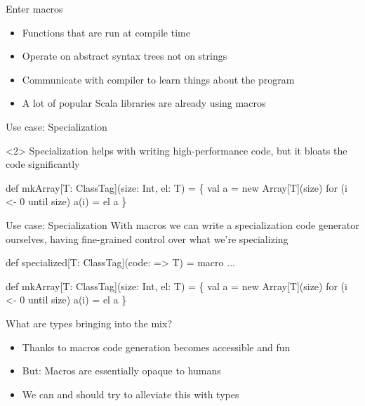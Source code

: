 \documentclass{beamer}
\begin{document}

\begin{frame}{Enter macros}
  \begin{itemize}
    \item Functions that are run at compile time
    \item Operate on abstract syntax trees not on strings
    \item Communicate with compiler to learn things about the program
    \item A lot of popular Scala libraries are already using macros
  \end{itemize}
\end{frame}

\begin{frame}[fragile]{Use case: Specialization}
  \begin{visibleenv}<2>
    Specialization helps with writing high-performance code,
    but it bloats the code significantly
  \end{visibleenv}

  \vspace{1em}
  \begin{semiverbatim}
def mkArray[T: ClassTag](size: Int, el: T) = \{
  val a = new Array[T](size)
  for (i <- 0 until size) a(i) = el
  a
\}
  \end{semiverbatim}
\end{frame}

\begin{frame}[fragile]{Use case: Specialization}
  With macros we can write a specialization code generator ourselves,
  having fine-grained control over what we're specializing

  \vspace{1em}
  \begin{semiverbatim}
def specialized[T: ClassTag](code: => T) = macro ...

def mkArray[T: ClassTag](size: Int, el: T) = \{
  val a = new Array[T](size)
    for (i <- 0 until size) a(i) = el
  \text{\color{blue}{\}}}
  a
\}
  \end{semiverbatim}
\end{frame}

\begin{frame}{What are types bringing into the mix?}
  \begin{itemize}
    \item Thanks to macros code generation becomes accessible and fun
    \item But: Macros are essentially opaque to humans
    \item We can and should try to alleviate this with types
  \end{itemize}
\end{frame}
\end{document}
